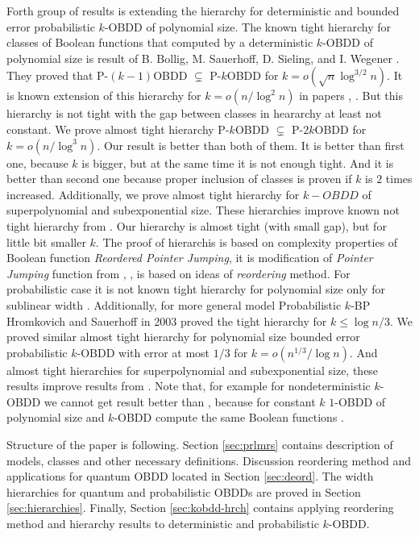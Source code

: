 \documentclass{llncs}
\begin{document}
Forth group of results is extending the hierarchy for deterministic and bounded error probabilistic $k$-OBDD of polynomial size. The known tight hierarchy for classes of Boolean functions that computed by a deterministic $k$-OBDD of polynomial size is result of B. Bollig, M. Sauerhoff, D. Sieling, and I. Wegener \cite{bssw96}. They proved that P-$(k-1)$OBDD $\subsetneq$ P-$k$OBDD for $k=o(\sqrt{n}\log^{3/2}n)$. It is known extension of this hierarchy for $k=o(n/\log^2 n)$ in papers \cite{K16}, \cite{ak13}. But this hierarchy is not tight with the gap between classes in heararchy at least not constant. We prove almost tight hierarchy P-$k$OBDD $\subsetneq$ P-$2k$OBDD for $k = o(n/\log^3 n)$.  Our result is better than both of them. It is better than first one, because $k$ is bigger, but at the same time it is not enough tight. And it is better than second one because proper inclusion of classes is proven if $k$ is $2$ times increased. Additionally, we prove almost tight hierarchy for $k-OBDD$ of superpolynomial and subexponential size. These hierarchies improve known not tight hierarchy from \cite{K16}. Our hierarchy is almost tight (with small gap), but for little bit smaller $k$. The proof of hierarchis is based on complexity properties of Boolean function {\em Reordered Pointer Jumping}, it is modification of {\em Pointer Jumping} function from \cite{nw91}, \cite{bssw96}, is based on ideas of {\em reordering} method. For probabilistic case it is not known tight hierarchy for polynomial size only for sublinear width \cite{K16}. Additionally, for more general model Probabilistic $k$-BP  Hromkovich and Sauerhoff in 2003 \cite{hs2003} proved the tight hierarchy for $k\leq\log n/3$. We proved similar almost tight hierarchy for polynomial size bounded error probabilistic $k$-OBDD with error at most $1/3$ for $k = o(n^{1/3}/\log n)$. And almost tight hierarchies for superpolynomial and subexponential size, these results improve results from \cite{K16}. Note that, for example for nondeterministic $k$-OBDD we cannot get result better than \cite{K16}, because for constant $k$ $1$-OBDD of polynomial size and $k$-OBDD compute the same Boolean functions \cite{bhw2006}.

Structure of the paper is following. Section \ref{sec:prlmrs} contains description of models, classes and other necessary definitions. Discussion reordering method and applications for quantum OBDD located in  Section \ref{sec:deord}. The width hierarchies for quantum and probabilistic OBDDs are proved in Section \ref{sec:hierarchies}. Finally, Section \ref{sec:kobdd-hrch} contains applying reordering method and hierarchy results to deterministic and probabilistic $k$-OBDD.
\end{document}
